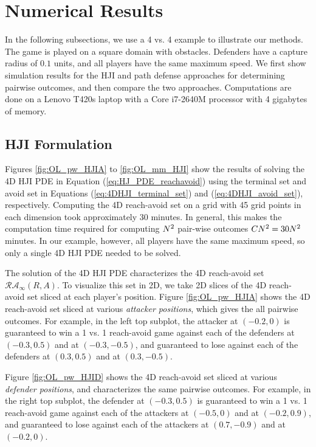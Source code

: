 \section{Numerical Results}
\label{sec:simulation}
In the following subsections, we use a 4 vs. 4 example to illustrate our methods. The game is played on a square domain with obstacles. Defenders have a capture radius of $0.1$ units, and all players have the same maximum speed. We first show simulation results for the HJI and path defense approaches for determining pairwise outcomes, and then compare the two approaches. Computations are done on a Lenovo T420s laptop with a Core i7-2640M processor with 4 gigabytes of memory.

\subsection{HJI Formulation}
Figures \ref{fig:OL_pw_HJIA} to \ref{fig:OL_mm_HJI} show the results of solving the 4D HJI PDE in Equation (\ref{eq:HJ_PDE_reachavoid}) using the terminal set and avoid set in Equations (\ref{eq:4DHJI_terminal_set}) and (\ref{eq:4DHJI_avoid_set}), respectively. Computing the 4D reach-avoid set on a grid with 45 grid points in each dimension took approximately 30 minutes. In general, this makes the computation time required for computing $N^2$ pair-wise outcomes $C N^2 = 30 N^2$ minutes. In our example, however, all players have the same maximum speed, so only a single 4D HJI PDE needed to be solved.

The solution of the 4D HJI PDE characterizes the 4D reach-avoid set $\mathcal{RA}_\infty(R,A)$. To visualize this set in 2D, we take 2D slices of the 4D reach-avoid set sliced at each player's position. Figure \ref{fig:OL_pw_HJIA} shows the 4D reach-avoid set sliced at various \textit{attacker positions}, which gives the all pairwise outcomes. For example, in the left top subplot, the attacker at $(-0.2, 0)$ is guaranteed to win a 1 vs. 1 reach-avoid game against each of the defenders at $(-0.3, 0.5)$ and at $(-0.3, -0.5)$, and guaranteed to lose against each of the defenders at $(0.3, 0.5)$ and at $(0.3, -0.5)$.

Figure \ref{fig:OL_pw_HJID} shows the 4D reach-avoid set sliced at various \textit{defender positions}, and characterizes the same pairwise outcomes. For example,  in the right top subplot, the defender at $(-0.3, 0.5)$ is guaranteed to win a 1 vs. 1 reach-avoid game against each of the attackers at $(-0.5, 0)$ and at $(-0.2, 0.9)$, and guaranteed to lose against each of the attackers at $(0.7, -0.9)$ and at $(-0.2, 0)$.

